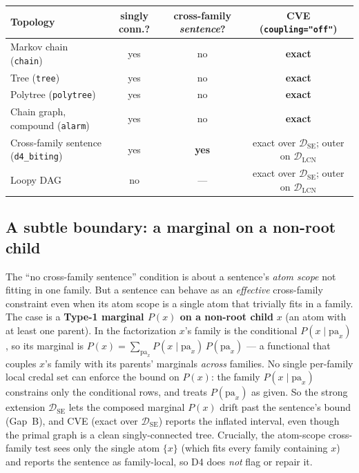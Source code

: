 \documentclass[11pt]{article}
\newcommand{\DSE}{\mathcal{D}_{\mathrm{SE}}}
\newcommand{\DLCN}{\mathcal{D}_{\mathrm{LCN}}}
\begin{document}
\begin{center}\small
\begin{tabular}{lccc}
\toprule
Topology & singly conn.? & cross-family \emph{sentence}? & CVE (\texttt{coupling="off"}) \\
\midrule
Markov chain (\texttt{chain})     & yes & no  & \textbf{exact} \\
Tree (\texttt{tree})              & yes & no  & \textbf{exact} \\
Polytree (\texttt{polytree})      & yes & no  & \textbf{exact} \\
Chain graph, compound (\texttt{alarm}) & yes & no  & \textbf{exact} \\
Cross-family sentence (\texttt{d4\_biting}) & yes & \textbf{yes} & exact over $\DSE$; outer on $\DLCN$ \\
Loopy DAG                          & no  & --- & exact over $\DSE$; outer on $\DLCN$ \\
\bottomrule
\end{tabular}
\end{center}

\subsection{A subtle boundary: a marginal on a non-root child}\label{sec:nonroot}
The ``no cross-family sentence'' condition is about a sentence's \emph{atom scope} not fitting in
one family. But a sentence can behave as an \emph{effective} cross-family constraint even when its
atom scope is a single atom that trivially fits in a family. The case is a \textbf{Type-1 marginal
$P(x)$ on a non-root child} $x$ (an atom with at least one parent). In the factorization $x$'s family
is the conditional $P(x\mid\mathrm{pa}_x)$, so its marginal is $P(x)=\sum_{\mathrm{pa}_x}
P(x\mid\mathrm{pa}_x)\,P(\mathrm{pa}_x)$ --- a functional that couples $x$'s family with its parents'
marginals \emph{across} families. No single per-family local credal set can enforce the bound on
$P(x)$: the family $P(x\mid\mathrm{pa}_x)$ constrains only the conditional rows, and treats
$P(\mathrm{pa}_x)$ as given. So the strong extension $\DSE$ lets the composed marginal $P(x)$ drift
past the sentence's bound (Gap~B), and CVE (exact over $\DSE$) reports the inflated interval, even
though the primal graph is a clean singly-connected tree. Crucially, the atom-scope cross-family test
sees only the single atom $\{x\}$ (which fits every family containing $x$) and reports the sentence as
family-local, so D4 does \emph{not} flag or repair it.
\end{document}
